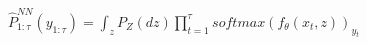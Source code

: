 \documentclass[preview]{standalone}
\begin{document}
\begin{align*}
\hat{P}_{1:\tau}^{NN} (y_{1:\tau}) = \int_z P_Z(dz)\prod_{t=1}^{\tau} softmax (f_\theta (x_t, z))_{y_t}
\end{align*}
\end{document}
